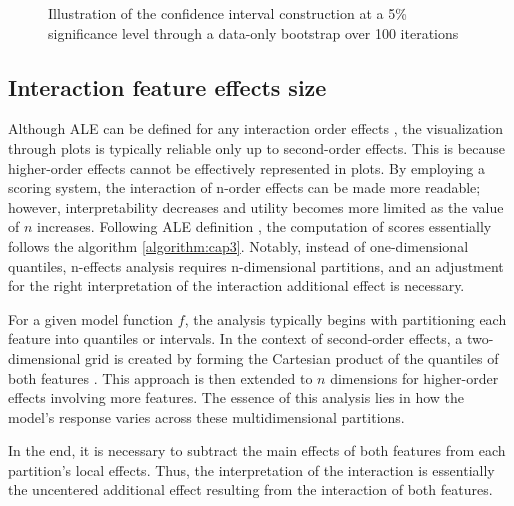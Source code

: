 \begin{figure}[ht!]
\centering
  \caption{Illustration of the confidence interval construction at a 5\% significance level through a data-only bootstrap over 100 iterations}
    \label{fig:bootstrap_no_full}
\end{figure}

\subsection{Interaction feature effects size}

Although ALE can be defined for any interaction order effects \cite{Apley2020VisualizingModels}, the visualization through plots is typically reliable only up to second-order effects. This is because higher-order effects cannot be effectively represented in plots. By employing a scoring system, the interaction of n-order effects can be made more readable; however, interpretability decreases and utility becomes more limited as the value of \(n\) increases. Following ALE definition \cite{Apley2020VisualizingModels}, the computation of scores essentially follows the algorithm \ref{algorithm:cap3}. Notably, instead of one-dimensional quantiles, n-effects analysis requires n-dimensional partitions, and an adjustment for the right interpretation of the interaction additional effect is necessary.

For a given model function \(f\), the analysis typically begins with partitioning each feature into quantiles or intervals. In the context of second-order effects, a two-dimensional grid is created by forming the Cartesian product of the quantiles of both features \cite{Apley2020VisualizingModels}. This approach is then extended to \(n\) dimensions for higher-order effects involving more features. The essence of this analysis lies in how the model's response varies across these multidimensional partitions. 

In the end, it is necessary to subtract the main effects of both features from each partition's local effects. Thus, the interpretation of the interaction is essentially the uncentered additional effect resulting from the interaction of both features.

